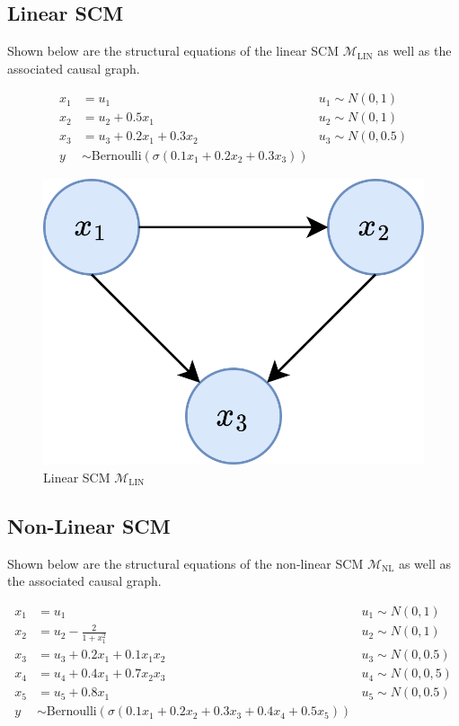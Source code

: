 \subsection{Linear SCM} \label{section:linear_scm}

Shown below are the structural equations of the linear SCM $\mathcal{M}_{\text{LIN}}$ as well as the associated causal graph.

\begin{align}
	x_1 & = u_1 & u_1 \sim N(0,1) \\ \nonumber
	x_2 & = u_2 + 0.5x_1 & u_2 \sim N(0,1) \\ \nonumber
	x_3 & = u_3 + 0.2x_1 + 0.3x_2 & u_3 \sim N(0,0.5) \\ \nonumber
	y   & \sim \text{Bernoulli}(\sigma(0.1x_1 + 0.2x_2 + 0.3x_3))
\end{align}

\begin{figure}[!htb]
	\centering
	\includegraphics[width=0.4\linewidth]{images/draw.io/toy_scm.png}
	\caption{Linear SCM $\mathcal{M}_{\text{LIN}}$}
	\label{fig:simple_scm}
\end{figure}

\subsection{Non-Linear SCM}

Shown below are the structural equations of the non-linear SCM $\mathcal{M}_{\text{NL}}$ as well as the associated causal graph.

\begin{align}
	x_1 & = u_1 & u_1 \sim N(0,1) \\ \nonumber
	x_2 & = u_2 - \frac{2}{1 + x_1^2} & u_2 \sim N(0,1) \\ \nonumber
	x_3 & = u_3 + 0.2x_1 + 0.1x_1x_2 & u_3 \sim N(0,0.5) \\ \nonumber
	x_4 & = u_4 + 0.4x_1 + 0.7x_2x_3 & u_4 \sim N(0,0,5) \\ \nonumber
	x_5 & = u_5 + 0.8x_1 & u_5 \sim N(0,0.5) \\ \nonumber
	y   & \sim \text{Bernoulli}(\sigma(0.1x_1 + 0.2x_2 + 0.3x_3 + 0.4x_4 + 0.5x_5))
\end{align}

